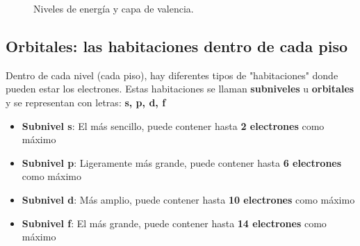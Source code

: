 \begin{minipage}{0.45\textwidth}
    \begin{figure}[H]
        \centering
        \caption{Niveles de energía y capa de valencia.}
        \label{fig:niveles_capa_de_valencia}
    \end{figure}
\end{minipage}

\subsection{Orbitales: las habitaciones dentro de cada piso}
Dentro de cada nivel (cada piso), hay diferentes tipos de "habitaciones" donde pueden estar los electrones. Estas habitaciones se llaman \textbf{subniveles} u \textbf{orbitales} y se representan con letras: \textbf{s, p, d, f}
\begin{itemize}
    \item \textbf{Subnivel s}: El más sencillo, puede contener hasta \textbf{2 electrones} como máximo
    \item \textbf{Subnivel p}: Ligeramente más grande, puede contener hasta \textbf{6 electrones} como máximo
    \item \textbf{Subnivel d}: Más amplio, puede contener hasta \textbf{10 electrones} como máximo
    \item \textbf{Subnivel f}: El más grande, puede contener hasta \textbf{14 electrones} como máximo
\end{itemize}
